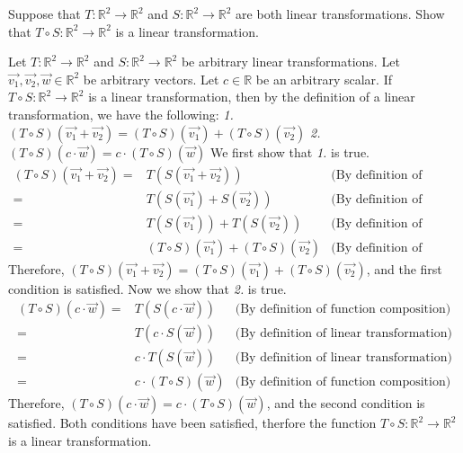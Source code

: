 \documentclass[12pt]{article}
\newenvironment{problem}[2][Problem]
{
	\begin{trivlist} 
		\item[\hskip \labelsep {\bfseries #1 #2:}]
	}
{
	\end{trivlist}
	}
\newenvironment{solution}[1][Solution]
{
	\begin{trivlist} 
		\item[\hskip \labelsep {\itshape #1:}]
	}
	{
	\end{trivlist}
}
\begin{document}
\newpage
\begin{problem}{5}
Suppose that $T:\mathbb{R} ^2 \to \mathbb{R} ^2$ and $S:\mathbb{R} ^2 \to \mathbb{R} ^2$ are both linear transformations. Show that $T \circ S: \mathbb{R} ^2 \to \mathbb{R} ^2$ is a linear transformation.
\begin{solution}
Let $T:\mathbb{R} ^2 \to \mathbb{R} ^2$ and $S:\mathbb{R} ^2 \to \mathbb{R} ^2$ be arbitrary linear transformations. Let $\vec{v_{1}}, \vec{v_{2}}, \vec{w} \in \mathbb{R}^2$ be arbitrary vectors.
Let $c \in \mathbb{R}$ be an arbitrary scalar.
If  $T \circ S: \mathbb{R} ^2 \to \mathbb{R} ^2$ is a linear transformation, then by the definition of a linear transformation, we have the following:
\noindent
\newline
\newline
{\it 1. } $(T \circ S)(\vec{v_{1}} + \vec{v_{2}}) = (T \circ S)(\vec{v_{1}}) + (T \circ S)(\vec{v_{2}})$
\noindent
\newline
\newline
{\it 2. } $(T \circ S)(c \cdot \vec{w}) = c \cdot (T \circ S)(\vec{w})$
\noindent
\newline
\newline
We first show that {\it 1. }is true.
\begin{align*}
(T \circ S)(\vec{v_{1}} + \vec{v_{2}}) =& T(S(\vec{v_{1}} + \vec{v_{2}})) &\text{(By definition of function composition)}\\
=& T(S(\vec{v_{1}}) + S(\vec{v_{2}})) &\text{(By definition of linear transformation)}\\
=&T(S(\vec{v_{1}})) + T(S(\vec{v_{2}})) &\text{(By definition of linear transformation)}\\
=& (T \circ S)(\vec{v_{1}}) + (T \circ S)(\vec{v_{2}}) &\text{(By definition of function composition)}
\end{align*}
Therefore, $(T \circ S)(\vec{v_{1}} + \vec{v_{2}}) = (T \circ S)(\vec{v_{1}}) + (T \circ S)(\vec{v_{2}})$, and the first condition is satisfied.
\newline
Now we show that {\it 2. }is true.
\begin{align*}
(T \circ S)(c \cdot \vec{w}) =& T(S(c \cdot \vec{w})) &\text{(By definition of function composition)}\\
=& T(c \cdot S(\vec{w})) &\text{(By definition of linear transformation)}\\
=& c \cdot T(S(\vec{w})) &\text{(By definition of linear transformation)}\\
=& c \cdot (T \circ S)(\vec{w}) &\text{(By definition of function composition)}
\end{align*}
Therefore, $(T \circ S)(c \cdot \vec{w}) = c \cdot (T \circ S)(\vec{w})$, and the second condition is satisfied. Both conditions have been satisfied, therfore the function $T \circ S: \mathbb{R}^2 \to \mathbb{R}^2$ is a linear transformation.




\end{solution}
\end{problem}
\end{document}
